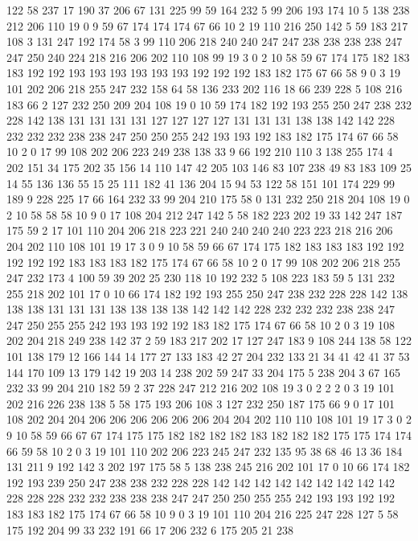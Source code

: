 122 58 237 17 190 37 206 67 131 225 99 59 164 232 5 99 206 193 174 10
5 138 238 212 206 110 19 0 9 59 67 174 174 174 67 66 10 2 19 110
216 250 142 5 59 183 217 108 3 131 247 192 174 58 3 99 110 206 218 240
240 247 247 238 238 238 238 247 247 250 240 224 218 216 206 202 110 108 99 19
3 0 2 10 58 59 67 174 175 182 183 183 192 192 193 193 193 193 193 193
192 192 192 183 182 175 67 66 58 9 0 3 19 101 202 206 218 255 247 232
158 64 58 136 233 202 116 18 66 239 228 5 108 216 183 66 2 127 232 250
209 204 108 19 0 10 59 174 182 192 193 255 250 247 238 232 228 142 138 131
131 131 131 127 127 127 127 131 131 131 138 138 142 142 228 232 232 232 238 238
247 250 250 255 242 193 193 192 183 182 175 174 67 66 58 10 2 0 17 99
108 202 206 223 249 238 138 33 9 66 192 210 110 3 138 255 174 4 202 151
34 175 202 35 156 14 110 147 42 205 103 146 83 107 238 49 83 183 109 25
14 55 136 136 55 15 25 111 182 41 136 204 15 94 53 122 58 151 101 174
229 99 189 9 228 225 17 66 164 232 33 99 204 210 175 58 0 131 232 250
218 204 108 19 0 2 10 58 58 58 10 9 0 17 108 204 212 247 142 5
58 182 223 202 19 33 142 247 187 175 59 2 17 101 110 204 206 218 223 221
240 240 240 240 223 223 218 216 206 204 202 110 108 101 19 17 3 0 9 10
58 59 66 67 174 175 182 183 183 183 192 192 192 192 192 183 183 183 182 175
174 67 66 58 10 2 0 17 99 108 202 206 218 255 247 232 173 4 100 59
39 202 25 230 118 10 192 232 5 108 223 183 59 5 131 232 255 218 202 101
17 0 10 66 174 182 192 193 255 250 247 238 232 228 228 142 138 138 138 131
131 131 138 138 138 138 142 142 142 228 232 232 232 238 238 247 247 250 255 255
242 193 193 192 192 183 182 175 174 67 66 58 10 2 0 3 19 108 202 204
218 249 238 142 37 2 59 183 217 202 17 127 247 183 9 108 244 138 58 122
101 138 179 12 166 144 14 177 27 133 183 42 27 204 232 133 21 34 41 42
41 37 53 144 170 109 13 179 142 19 203 14 238 202 59 247 33 204 175 5
238 204 3 67 165 232 33 99 204 210 182 59 2 37 228 247 212 216 202 108
19 3 0 2 2 2 0 3 19 101 202 216 226 238 138 5 58 175 193 206
108 3 127 232 250 187 175 66 9 0 17 101 108 202 204 204 206 206 206 206
206 206 204 204 202 110 110 108 101 19 17 3 0 2 9 10 58 59 66 67
67 174 175 175 182 182 182 182 183 182 182 182 175 175 174 174 66 59 58 10
2 0 3 19 101 110 202 206 223 245 247 232 135 95 38 68 46 13 36 184
131 211 9 192 142 3 202 197 175 58 5 138 238 245 216 202 101 17 0 10
66 174 182 192 193 239 250 247 238 238 232 228 228 142 142 142 142 142 142 142
142 142 228 228 228 232 232 238 238 238 247 247 250 250 255 255 242 193 193 192
192 183 183 182 175 174 67 66 58 10 9 0 3 19 101 110 204 216 225 247
228 127 5 58 175 192 204 99 33 232 191 66 17 206 232 6 175 205 21 238
